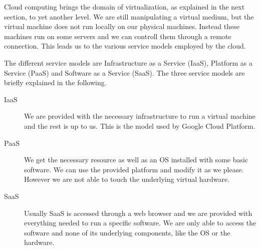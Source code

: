 Cloud computing brings the domain of virtualization, as explained in
the next section, to yet another level. We are still manipulating a
virtual medium, but the virtual machine does not run locally on our
physical machines. Instead these machines run on some servers and we
can controll them through a remote connection. This leads us to the
various service models employed by the cloud.

The different service models are Infrastructure as a Service (IaaS),
Platform as a Service (PaaS) and Software as a Service (SaaS). The
three service models are briefly explained in the following.
\begin{description}

	\item[IaaS] We are provided with the necessary infrastructure to
	run a virtual machine and the rest is up to us.  This is the model
	used by Google Cloud Platform.

	\item[PaaS] We get the necessary resource as well as an OS
	installed with some basic software. We can use the provided platform
	and modify it as we please. However we are not able to touch the
	underlying virtual hardware.

	\item[SaaS] Usually SaaS is accessed through a web browser and we
	are provided with everything needed to run a specific software. We
	are only able to access the software and none of its underlying
	components, like the OS or the hardware.

\end{description}
